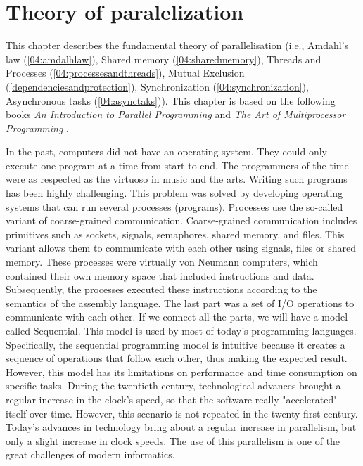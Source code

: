 \chapter{Theory of paralelization}

This chapter describes the fundamental theory of parallelisation (i.e., Amdahl's law (\ref{04:amdalhlaw}), Shared memory (\ref{04:sharedmemory}), Threads and Processes (\ref{04:processesandthreads}), Mutual Exclusion (\ref{dependenciesandprotection}), Synchronization (\ref{04:synchronization}), Asynchronous tasks (\ref{04:asynctaks})). This chapter is based on the following books \emph{An Introduction to Parallel Programming} \cite{introductionToParallelProgramming} and \emph{The Art of Multiprocessor Programming} \cite{artOfMultiprocessorProgramming}.

In the past, computers did not have an operating system. They could only execute one program at a time from start to end. The programmers of the time were as respected as the virtuoso in music and the arts. Writing such programs has been highly challenging. This problem was solved by developing operating systems that can run several processes (programs). 
Processes use the so-called variant of coarse-grained communication. 
Coarse-grained communication includes primitives such as sockets, signals, semaphores, shared memory, and files. This variant allows them to communicate with each other using signals, files or shared memory.  These processes were virtually von Neumann computers, which contained their own memory space that included instructions and data. Subsequently, the processes executed these instructions according to the semantics of the assembly language. The last part was a set of I/O operations to communicate with each other. If we connect all the parts, we will have a model called Sequential. This model is used by most of today's programming languages.  Specifically, the sequential programming model is intuitive because it creates a sequence of operations that follow each other, thus making the expected result. However, this model has its limitations on performance and time consumption on specific tasks. During the twentieth century, technological advances brought a regular increase in the clock's speed, so that the software really "accelerated" itself over time. However, this scenario is not repeated in the twenty-first century. Today's advances in technology bring about a regular increase in parallelism, but only a slight increase in clock speeds. The use of this parallelism is one of the great challenges of modern informatics.

